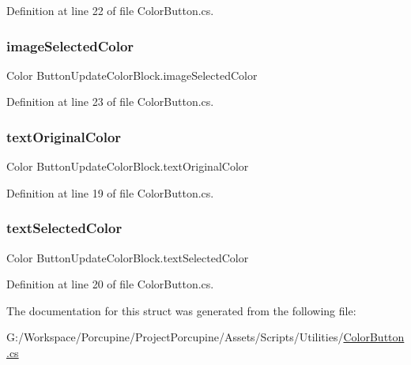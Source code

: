 Definition at line 22 of file Color\+Button.\+cs.

\mbox{\label{struct_button_update_color_block_a1536976b251add90a184f428dd71db33}} 
\subsubsection{\texorpdfstring{image\+Selected\+Color}{imageSelectedColor}}
{\footnotesize\ttfamily Color Button\+Update\+Color\+Block.\+image\+Selected\+Color}



Definition at line 23 of file Color\+Button.\+cs.

\mbox{\label{struct_button_update_color_block_a4d1b4676724da62fd084257f2ba7fce8}} 
\subsubsection{\texorpdfstring{text\+Original\+Color}{textOriginalColor}}
{\footnotesize\ttfamily Color Button\+Update\+Color\+Block.\+text\+Original\+Color}



Definition at line 19 of file Color\+Button.\+cs.

\mbox{\label{struct_button_update_color_block_a1f809394ca3fd7c6be0f7e983097d1b6}} 
\subsubsection{\texorpdfstring{text\+Selected\+Color}{textSelectedColor}}
{\footnotesize\ttfamily Color Button\+Update\+Color\+Block.\+text\+Selected\+Color}



Definition at line 20 of file Color\+Button.\+cs.



The documentation for this struct was generated from the following file\+:\begin{DoxyCompactItemize}
\item 
G\+:/\+Workspace/\+Porcupine/\+Project\+Porcupine/\+Assets/\+Scripts/\+Utilities/\hyperlink{_color_button_8cs}{Color\+Button.\+cs}\end{DoxyCompactItemize}
